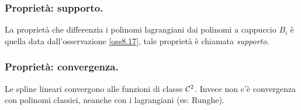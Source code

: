 \subsubsection{Proprietà: supporto.}
La proprietà che differenzia i polinomi lagrangiani dai polinomi a cappuccio
$B_i$ è quella data dall'osservazione \ref{oss8.17}, tale proprietà è
chiamata \emph{supporto}. 

\subsubsection{Proprietà: convergenza.}
Le spline lineari convergono alle funzioni di classe $\mathcal{C}^2$. Invece non 
c'è convergenza con polinomi classici, neanche con i lagrangiani (es: Runghe).
 
